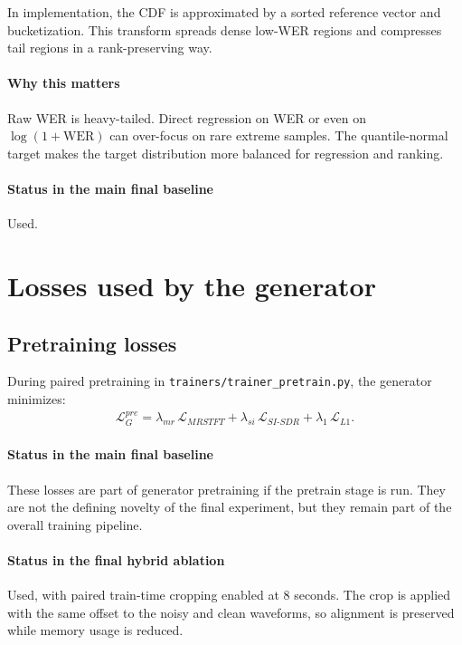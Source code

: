 \documentclass[11pt]{article}
\begin{document}
In implementation, the CDF is approximated by a sorted reference vector and bucketization. This transform spreads dense low-WER regions and compresses tail regions in a rank-preserving way.

\paragraph{Why this matters}
Raw WER is heavy-tailed. Direct regression on WER or even on $\log(1+\text{WER})$ can over-focus on rare extreme samples. The quantile-normal target makes the target distribution more balanced for regression and ranking.

\paragraph{Status in the main final baseline}
Used.

\section{Losses used by the generator}

\subsection{Pretraining losses}
During paired pretraining in \texttt{trainers/trainer\_pretrain.py}, the generator minimizes:
\begin{align}
    \mathcal{L}_{G}^{pre} = \lambda_{mr}\,\mathcal{L}_{MRSTFT} + \lambda_{si}\,\mathcal{L}_{SI\text{-}SDR} + \lambda_{1}\,\mathcal{L}_{L1}.
\end{align}

\paragraph{Status in the main final baseline}
These losses are part of generator pretraining if the pretrain stage is run. They are not the defining novelty of the final experiment, but they remain part of the overall training pipeline.

\paragraph{Status in the final hybrid ablation}
Used, with paired train-time cropping enabled at 8 seconds. The crop is applied with the same offset to the noisy and clean waveforms, so alignment is preserved while memory usage is reduced.
\end{document}
